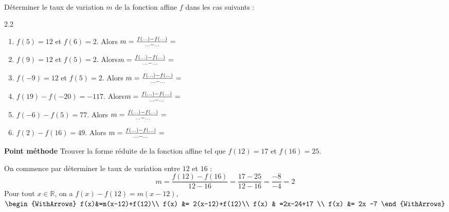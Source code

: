 \documentclass[main.tex]{subfiles}
\begin{document}
\begin{exercise} \hfill \\
Déterminer le taux de variation $m$ de la fonction affine $f$ dans les cas suivants :\vspace{-0.5em}
	\begin{spacing}{2.2} 
		\begin{enumerate}[label={}, leftmargin=*]
			\item $f(5)=12$ et $f(6)=2$. Alors $m=\frac{f(\ldots)-f(\ldots)}{\ldots - \ldots}=\dotfill$
			\item $f(9)=12$ et $f(5)=2$. Alors$m=\frac{f(\ldots)-f(\ldots)}{\ldots - \ldots}=\dotfill$
			\item $f(-9)=12$ et $f(5)=2$. Alors $m=\frac{f(\ldots)-f(\ldots)}{\ldots - \ldots}=\dotfill$
			\item $f(19)-f(-20)=-117$. Alors$m=\frac{f(\ldots)-f(\ldots)}{\ldots - \ldots}=\dotfill$
			\item $f(-6)-f(5)=77$. Alors $m=\frac{f(\ldots)-f(\ldots)}{\ldots - \ldots}=\dotfill$
			\item $f(2)-f(16)=49$. Alors $m=\frac{f(\ldots)-f(\ldots)}{\ldots - \ldots}=\dotfill$
		\end{enumerate}
	\end{spacing}
\end{exercise}\vspace{-2em}
\begin{eBox} 
\textbf{Point méthode} Trouver la forme réduite de la fonction affine tel que  $f(12)=17$ et $f(16)=25$.
	
On commence par déterminer	le taux de variation entre $12$ et $16$ :
	\setlength{\abovedisplayskip}{3pt}
	\setlength{\belowdisplayskip}{3pt}
	$$
	m=\frac{f(12)-f(16)}{12-16}= \frac{17-25}{12-16}=\frac{-8}{-4}=2 
	$$
	Pour tout $x\in\mathbb{R}$, \hfill on a $f(x)-f(12)=m(x-12)$, \hfill  $\begin{WithArrows}
		f(x)&=m(x-12)+f(12)\\
		f(x) &= 2(x-12)+f(12)\\
		f(x) & =2x-24+17 \\
		f(x) &= 2x -7
	\end{WithArrows}$
\end{eBox}
\end{document}
